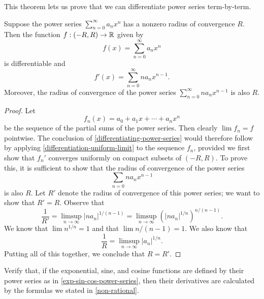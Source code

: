 This theorem lets us prove that we can differentiate power series term-by-term.

\begin{theorem} \label{differentiating-power-series}
	Suppose the power series $\sum_{n = 0}^\infty a_n x^n$
	has a nonzero radius of convergence $R$. Then the function $f : (-R, R) \to \mathbb{R}$ given by
	\[ f(x) = \sum_{n = 0}^\infty a_n x^n \]
	is differentiable and
	\[ f'(x) = \sum_{n = 0}^\infty na_n x^{n-1}. \]
	Moreover, the radius of convergence of the power series $\sum_{n = 0}^\infty na_n x^{n-1}$
	is also $R$. 
\end{theorem}

\begin{proof}
	Let 
	\[ f_n(x) = a_0 + a_1 x + \dotsb + a_n x^n \]
	be the sequence of the partial sums of the power series. Then clearly $\lim f_n = f$ pointwise. The conclusion of \cref{differentiating-power-series} would therefore follow by applying \cref{differentiation-uniform-limit} to the sequence $f_n$, provided we first show that $f_n'$ converges uniformly on compact subsets of $(-R, R)$. To prove this, it is sufficient to show that the radius of convergence of the power series 
	\[ \sum_{n = 0} na_n x^{n-1} \]
	is also $R$. Let $R'$ denote the radius of convergence of this power series; we want to show that $R' = R$. Observe that
	\[ \frac{1}{R'} = \limsup_{n \to \infty} |na_n|^{1/(n-1)} = \limsup_{n \to \infty} (|na_n|^{1/n})^{n/(n-1)}. \]
	We know that $\lim n^{1/n} = 1$ and that $\lim n/(n-1) = 1$. We also know that
	\[ \frac{1}{R} = \limsup_{n \to \infty} |a_n|^{1/n}.  \]
	Putting all of this together, we conclude that $R = R'$. 
\end{proof}

\begin{exercise}
	Verify that, if the exponential, sine, and cosine functions are defined by their power series as in \cref{exp-sin-cos-power-series}, then their derivatives are calculated by the formulas we stated in \cref{non-rational}. 
\end{exercise}

